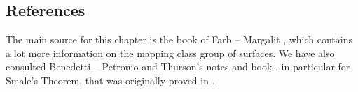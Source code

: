 \subsection{References}
The main source for this chapter is the book of Farb -- Margalit \cite{FM}, which contains a lot more information on the mapping class group of surfaces. We have also consulted Benedetti -- Petronio \cite{BP} and Thurson's notes \cite{Th} and book \cite{Th_book}, in particular for Smale's Theorem, that was originally proved in \cite{Sma}.

